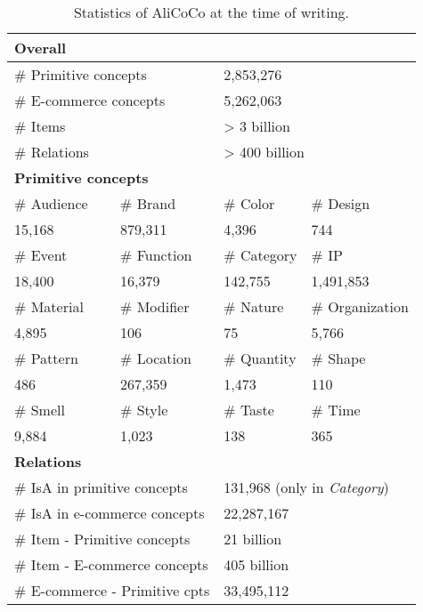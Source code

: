 \begin{table}[th]
	\small
	\begin{tabular}{|l|l|l|l|}
		\hline
		\multicolumn{4}{|l|}{\textbf{Overall}} \\ 
		\hline
		\multicolumn{2}{|l|}{\# Primitive concepts} &
		\multicolumn{2}{l|}{2,853,276}  \\
		\hline
		\multicolumn{2}{|l|}{\# E-commerce concepts} &  
		\multicolumn{2}{l|}{5,262,063}  \\ 
		\hline
		\multicolumn{2}{|l|}{\# Items} &
		\multicolumn{2}{l|}{> 3 billion} \\ 
		\hline
		\multicolumn{2}{|l|}{\# Relations} &
		\multicolumn{2}{l|}{> 400 billion} \\ 
		\hline
		\hline
		\multicolumn{4}{|l|}{\textbf{Primitive concepts}} \\ 
		\hline
		\# Audience &\# Brand &\# Color &\# Design  \\
		\cline{1-4}
		15,168 & 879,311 & 4,396 & 744 \\
		\cline{1-4}
		\# Event & \# Function & \# Category &\# IP  \\
		\cline{1-4}
		 18,400 & 16,379 & 142,755 & 1,491,853
		  \\
		\cline{1-4}
		\# Material & \# Modifier & \# Nature &\# Organization  \\
		\cline{1-4}
		 4,895 & 106 & 75 & 5,766 \\
		\cline{1-4}
		\# Pattern & \# Location & \# Quantity &\# Shape  \\
		\cline{1-4}
		 486 & 267,359 & 1,473 & 110 \\
		\cline{1-4}
		\# Smell & \# Style & \# Taste &\# Time  \\
		\cline{1-4}
		 9,884 & 1,023 & 138 & 365 \\
		\hline
		\hline
		\multicolumn{4}{|l|}{\textbf{Relations}} \\ 
		\hline
		\multicolumn{2}{|l|}{\# IsA in primitive concepts} &
		\multicolumn{2}{l|}{131,968 (only in \textit{Category})}  \\
		\hline
		\multicolumn{2}{|l|}{\# IsA in e-commerce concepts} &
		\multicolumn{2}{l|}{22,287,167}  \\
		\hline
		\multicolumn{2}{|l|}{\# Item - Primitive concepts} &
		\multicolumn{2}{l|}{21 billion}  \\
		\hline
		\multicolumn{2}{|l|}{\# Item - E-commerce concepts} &
		\multicolumn{2}{l|}{405 billion}  \\
		\hline
		\multicolumn{2}{|l|}{\# E-commerce - Primitive cpts} &
		\multicolumn{2}{l|}{33,495,112}  \\
		\hline
	\end{tabular}
	\caption{Statistics of AliCoCo at the time of writing.}
	\label{tab:data}
\end{table}

